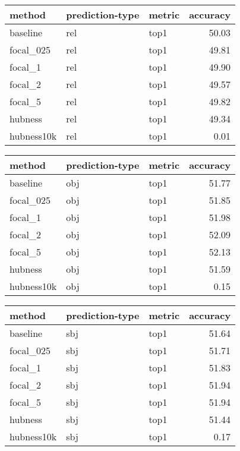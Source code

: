 \begin{tabular}{lllr}
\toprule
     method & prediction-type & metric &  accuracy \\
\midrule
   baseline &             rel &   top1 &     50.03 \\
  focal\_025 &             rel &   top1 &     49.81 \\
    focal\_1 &             rel &   top1 &     49.90 \\
    focal\_2 &             rel &   top1 &     49.57 \\
    focal\_5 &             rel &   top1 &     49.82 \\
    hubness &             rel &   top1 &     49.34 \\
 hubness10k &             rel &   top1 &      0.01 \\
\bottomrule
\end{tabular}
\begin{tabular}{lllr}
\toprule
     method & prediction-type & metric &  accuracy \\
\midrule
   baseline &             obj &   top1 &     51.77 \\
  focal\_025 &             obj &   top1 &     51.85 \\
    focal\_1 &             obj &   top1 &     51.98 \\
    focal\_2 &             obj &   top1 &     52.09 \\
    focal\_5 &             obj &   top1 &     52.13 \\
    hubness &             obj &   top1 &     51.59 \\
 hubness10k &             obj &   top1 &      0.15 \\
\bottomrule
\end{tabular}
\begin{tabular}{lllr}
\toprule
     method & prediction-type & metric &  accuracy \\
\midrule
   baseline &             sbj &   top1 &     51.64 \\
  focal\_025 &             sbj &   top1 &     51.71 \\
    focal\_1 &             sbj &   top1 &     51.83 \\
    focal\_2 &             sbj &   top1 &     51.94 \\
    focal\_5 &             sbj &   top1 &     51.94 \\
    hubness &             sbj &   top1 &     51.44 \\
 hubness10k &             sbj &   top1 &      0.17 \\
\bottomrule
\end{tabular}
